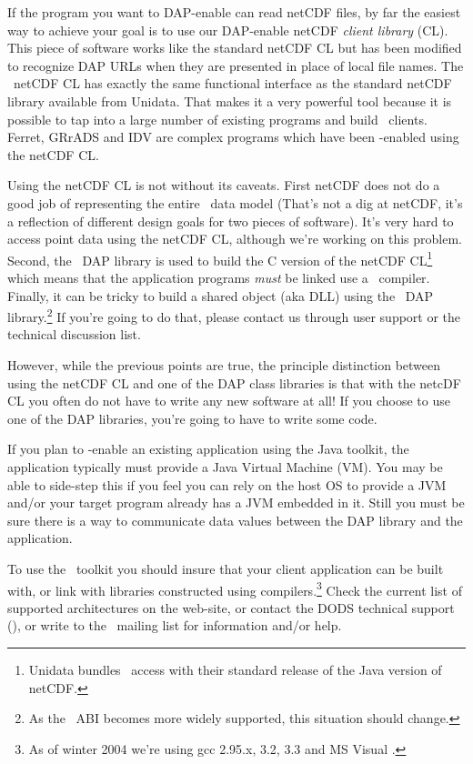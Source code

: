 \documentclass{dods-paper}
\begin{document}
If the program you want to DAP-enable can read netCDF files, by far the
easiest way to achieve your goal is to use our DAP-enable netCDF \emph{client
library} (CL). This piece of software works like the standard netCDF CL but
has been modified to recognize DAP URLs when they are presented in place of
local file names. The \opendap\ netCDF CL has exactly the same functional
interface as the standard netCDF library available from Unidata. That makes
it a very powerful tool because it is possible to tap into a large number of
existing programs and build \opendap\ clients. Ferret, GRrADS and IDV are
complex programs which have been \opendap-enabled using the netCDF CL.

Using the netCDF CL is not without its caveats. First netCDF does
not do a good job of representing the entire \opendap\ data model (That's not
a dig at netCDF, it's a reflection of different design goals for two pieces
of software). It's very hard to access point data using the netCDF CL,
although we're working on this problem. Second, the \Cpp\ DAP library is used
to build the C version of the netCDF CL\footnote{Unidata bundles \opendap\
access with their standard release of the Java version of netCDF.} which
means that the application programs \emph{must} be linked use a \Cpp\
compiler. Finally, it can be tricky to build a shared object (aka DLL) using
the \Cpp\ DAP library.\footnote{As the \Cpp\ ABI becomes more widely supported,
this situation should change.} If you're going to do that, please contact us
through user support or the technical discussion list.

However, while the previous points are true, the principle distinction
between using the netCDF CL and one of the DAP class libraries is that with
the netcDF CL you often do not have to write any new software at all! If you
choose to use one of the DAP libraries, you're going to have to write some
code. 

If you plan to \opendap-enable an existing application using the Java
toolkit, the application typically must provide a Java Virtual Machine (VM).
You may be able to side-step this if you feel you can rely on the host OS to
provide a JVM and/or your target program already has a JVM embedded in it.
Still you must be sure there is a way to communicate data values between the
DAP library and the application.

To use the \Cpp\ toolkit you should insure that your client application can be
built with, or link with libraries constructed using \Cpp
compilers.\footnote{As of winter 2004 we're using gcc 2.95.x, 3.2, 3.3 and MS
Visual \Cpp.} Check the current list of supported architectures on the
web-site, or contact the DODS technical support (\OPDsupport), or write to
the \OPDtechList\ mailing list for information and/or help.
\end{document}
